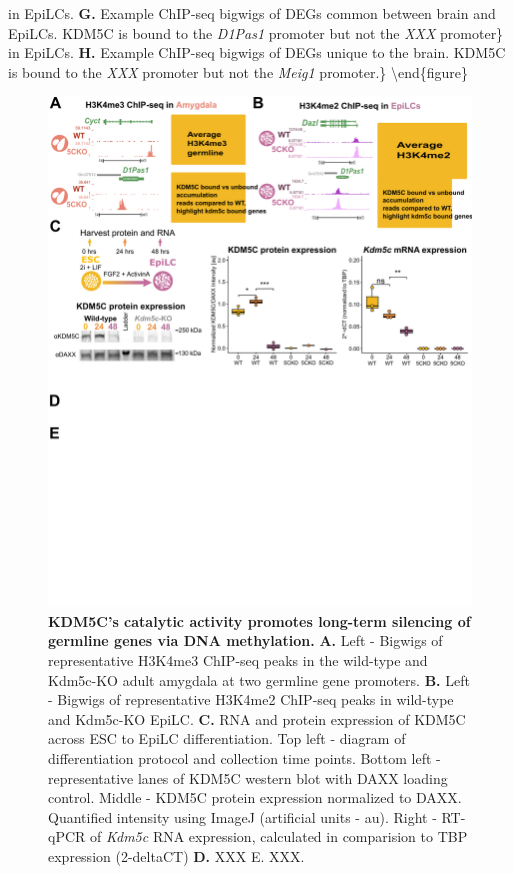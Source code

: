 \documentclass[
]{article}
\begin{document}
in EpiLCs. \textbf{G.} Example ChIP-seq bigwigs of DEGs common between
brain and EpiLCs. KDM5C is bound to the \textit{D1Pas1} promoter but not
the \textit{XXX} promoter\} in EpiLCs. \textbf{H.} Example ChIP-seq
bigwigs of DEGs unique to the brain. KDM5C is bound to the \textit{XXX}
promoter but not the \textit{Meig1} promoter.\} \label{figurelabel}
\textbackslash end\{figure\}

\begin{figure}
  \centering
  \includegraphics{../submission/compiled_figs/KDM5C_Mechanism.pdf}
  \caption[KDM5C’s catalytic activity promotes long-term silencing of germline genes via DNA methylation]{\textbf{KDM5C’s catalytic activity promotes long-term silencing of germline genes via DNA methylation.} \textbf{A.} Left - Bigwigs of representative H3K4me3 ChIP-seq peaks in the wild-type and Kdm5c-KO adult amygdala at two germline gene promoters. \textbf{B.} Left - Bigwigs of representative H3K4me2 ChIP-seq peaks in wild-type and Kdm5c-KO EpiLC. \textbf{C.} RNA and protein expression of KDM5C across ESC to EpiLC differentiation. Top left - diagram of differentiation protocol and collection time points. Bottom left - representative lanes of KDM5C western blot with DAXX loading control. Middle - KDM5C protein expression normalized to DAXX. Quantified intensity using ImageJ (artificial units - au). Right - RT-qPCR of \textit{Kdm5c} RNA expression, calculated in comparision to TBP expression (2-deltaCT) \textbf{D.} XXX {E.} XXX.}
  \label{figurelabel}
\end{figure}
\end{document}
